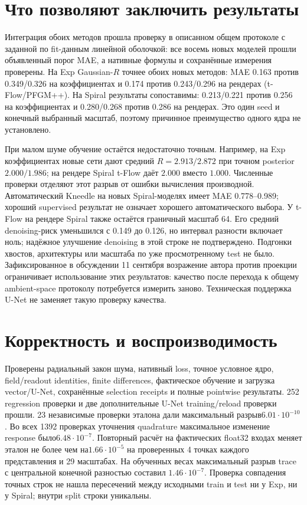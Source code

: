 \documentclass[10pt,a4paper]{article}
\begin{document}
\section*{Что позволяют заключить результаты}
Интеграция обоих методов прошла проверку в описанном общем протоколе с заданной
по fit-данным линейной оболочкой: все восемь новых моделей прошли объявленный
порог MAE, а нативные формулы и сохранённые измерения проверены.
На Exp Gaussian-$R$ точнее обоих новых методов: MAE 0.163 против 0.349/0.326
на коэффициентах и 0.174 против 0.243/0.296 на рендерах (t-Flow/PFGM++).
На Spiral результаты сопоставимы: 0.213/0.221 против 0.256 на коэффициентах
и 0.280/0.268 против 0.286 на рендерах. Это один seed и конечный выбранный
масштаб, поэтому причинное преимущество одного ядра не установлено.

При малом шуме обучение остаётся недостаточно точным. Например, на Exp
коэффициентах новые сети дают средний $R=2.913/2.872$ при точном posterior
$2.000/1.986$; на рендере Spiral t-Flow даёт $2.000$ вместо $1.000$.
Численные проверки отделяют этот разрыв от ошибки вычисления производной.
Автоматический Kneedle на новых Spiral-моделях имеет MAE 0.778--0.989;
хороший supervised результат не означает хорошего автоматического выбора.
У t-Flow на рендере Spiral также остаётся граничный масштаб 64. Его средний
denoising-риск уменьшился с 0.149 до 0.126, но интервал разности включает ноль;
надёжное улучшение denoising в этой строке не подтверждено. Подгонки хвостов,
архитектуры или масштаба по уже просмотренному test не было.
Зафиксированное в обсуждении 11 сентября возражение автора против проекции
ограничивает использование этих результатов: качество после перехода к
общему ambient-space протоколу потребуется измерить заново. Техническая
поддержка U-Net не заменяет такую проверку качества.

\section*{Корректность и воспроизводимость}
Проверены радиальный закон шума, нативный loss, точное условное ядро,
field/readout identities, finite differences, фактическое обучение и загрузка
vector/U-Net, сохранённые selection receipts и полные pointwise результаты.
252 regression проверки и две дополнительные U-Net training/reload проверки
прошли. 23 независимые проверки эталона дали максимальный разрыв$6.01\cdot10^{-10}$.
Во всех 1392 проверках уточнения quadrature максимальное изменение response
было$6.48\cdot10^{-7}$. Повторный расчёт на фактических float32 входах меняет
эталон не более чем на$1.66\cdot10^{-5}$ на проверенных 4 точках каждого
представления и 29 масштабах.
На обученных весах максимальный разрыв trace с центральной конечной разностью
составил $1.46\cdot10^{-7}$. Проверка совпадения точных строк не нашла пересечений
между исходными train и test ни у Exp, ни у Spiral; внутри split строки уникальны.
\end{document}
